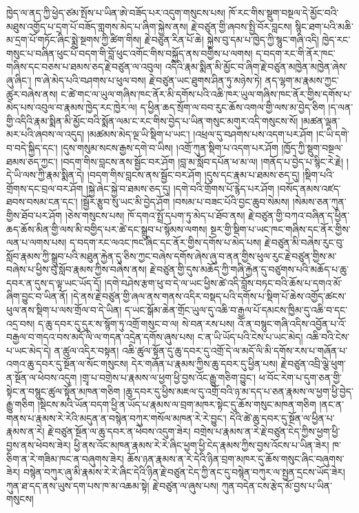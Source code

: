 \documentclass{article}
\begin{document}
ཁྱེད་ལ་ནད་ཀྱི་ཕྱེད་ཙམ་སྤོས་པ་ཡིན་ཨེ་བཟོད་པར་འདུག་གསུངས་པས། ཁོ་རང་གིས་སྡུག་བསྔལ་དེ་མྱོང་བའི་མཐུས་འགྱོད་པ་དྲག་པོ་བཟོད་གླགས་མེད་པ་ཞིག་སྐྱེས་ནས། རྗེ་བཙུན་གྱི་ཞབས་སྤྱི་བོར་བླངས། སྙིང་ཐག་པའི་མཆི་མ་དྲག་པོ་གཏོང་ཞིང་སྨྲེ་སྔགས་ཀྱི་ཚིག་གིས། རྗེ་བཙུན་རིན་པོ་ཆེ། སྐྱེས་བུ་དམ་པ་ཁྱེད་ཀྱི་སྙུང་གཞི་འདི། ཁྱེད་རང་གསུང་པ་བཞིན་ཕུང་པོ་བདག་གི་བློ་ཕུང་འགོང་གིས་བསྐྱོད་ནས་བགྱིས་པ་ལགས། ད་བདག་རང་གི་ནོར་ཁང་གཞིས་དང་བཅས་པ་ཐམས་ཅད་རྗེ་བཙུན་ལ་འབུལ། འདིའི་རྣམ་སྨིན་མི་མྱོང་བ་ཞིག་རྗེ་བཙུན་མཁྱེན་མཁྱེན་ཞེས་ཞུ་ཞིང་། ཁ་ཞེ་མེད་པའི་བཤགས་པ་ཕུལ་བས། རྗེ་བཙུན་ཡང་ཐུགས་ཤིན་ཏུ་མཉེས་ཏེ། ནད་ལྷག་མ་རྣམས་ཀྱང་ཚུར་བཞེས་ནས། ང་ཚེ་གང་ལ་ཡུལ་གཞིས་ཁང་ནོར་མི་དགོས་པའི་འཆི་ཁར་ཡུལ་གཞིས་ཁང་ནོར་གྱིས་དགོས་པ་མེད་པས་འབུལ་བ་རྣམས་ཁྱེད་རང་ཁྱེར་ལ། ད་ཕྱིན་ཆད་སྲོག་ལ་བབ་རུང་ཆོས་འགལ་གྱི་ལས་མ་བྱེད་ཅིག །ད་ལན་གྱི་འདིའི་རྣམ་སྨིན་མི་མྱོང་བའི་སྨོན་ལམ་ང་རང་གིས་བྱེད་པ་ཡིན་གསུང་མགུར་འདི་གསུངས་སོ། །མཚན་ལྡན་མར་པའི་ཞབས་ལ་འདུད། །མཚམས་མེད་ལྔ་ཡི་སྡིག་པ་ཡང་། །འཕྲལ་དུ་བཤགས་པས་འདག་པར་ཤོག །ང་ཡི་དགེ་བ་བདེ་སྐྱིད་དང་། །དུས་གསུམ་སངས་རྒྱས་དགེ་བ་ཡིས། །འགྲོ་ཀུན་སྡིག་པ་འདག་པར་ཤོག །ཁྱོད་ཀྱི་སྡུག་བསྔལ་ཐམས་ཅད་ཀྱང་། །བདག་གིས་བླངས་ནས་སྦྱོང་བར་ཤོག །བླ་མ་སློབ་དཔོན་ཕ་མ་ལ། །གནོད་པ་བྱེད་པ་སྙིང་རེ་རྗེ། །དེ་ཡི་ལས་ཀྱི་རྣམ་སྨིན་དེ། །བདག་གིས་བླངས་ནས་སྦྱོང་བར་ཤོག །དུས་དང་རྣམ་པ་ཐམས་ཅད་དུ། །སྡིག་པའི་གྲོགས་དང་བྲལ་བར་ཤོག །སྐྱེ་ཞེང་སྐྱེ་བ་ཐམས་ཅད་དུ། །དགེ་བའི་གྲོགས་པོ་རྙེད་པར་ཤོག །བསོད་ནམས་འཛད་ཐབས་བསམ་ངན་དང་། །སྦྱོར་རྩུབ་སུ་ཡང་མི་བྱེད་ཤོག །བསམ་པ་བཟང་པོའི་བྱང་ཆུབ་སེམས། །སེམས་ཅན་ཀུན་གྱིས་ཐོབ་པར་ཤོག །ཅེས་གསུངས་པས། ཁོ་དགའ་སྤྲོ་དཔག་ཏུ་མེད་པ་ཐོབ་ནས། རྗེ་བཙུན་གྱི་བཀའ་བཞིན་ད་ཕྱིན་ཆད་ཆོས་མིན་གྱི་ལས་མི་བགྱིད་པར་ཚེ་དང་སྒྲུབ་པ་སྙོམས་ལགས། སྔར་གྱི་སྡིག་པ་ཡང་ཁང་གཞིས་དང་ནོར་གྱིས་ལན་པ་ལགས་པས། ད་བདག་རང་ལའང་ཁང་ཞིང་དང་ནོར་གྱིས་དགོས་པ་མེད་པས། རྗེ་བཙུན་མི་བཞེས་རུང་བུ་སློབ་རྣམས་ཀྱི་སྒྲུབ་པའི་མཐུན་རྐྱེན་དུ་ཅིས་ཀྱང་བཞེས་དགོས་ཞེས་ཞུ་བ་ནན་གྱིས་ཕུལ་རུང་རྗེ་བཙུན་གྱིས་མ་བཞེས་པ་ཕྱིས་བུ་སློབ་རྣམས་ཀྱིས་བཞེས་ནས། རྗེ་བཙུན་གྱི་དུས་མཆོད་ཀྱི་གཞི་རྐྱེན་དུ་བཙུགས་པའི་མཆོད་པ་ཆུ་དབར་ན་དུས་ད་ལྟ་ཡང་ཡོད་དོ། །དགེ་བཤེས་རྩག་ཕུ་བ་དེ་ལ་ཡང་ཕྱིས་ཚེ་འདི་བློས་བཏང་བའི་ཆོས་པ་དགའ་མོ་ཞིག་བྱུང་བ་ཡིན་ནོ། །དེ་ནས་རྗེ་བཙུན་གྱི་ཞལ་ནས་གནས་འདིར་བསྡད་པའི་དགོས་པ་སྡིག་པོ་ཆེས་འགྱོད་ཚངས་ཕུལ་ནས་སྡིག་པ་ལས་གྲོལ་བ་དེ་ཡིན། ད་ཡང་སྒོམ་ཆེན་གྲོང་ཡུལ་དུ་འཆི་བ་རྒྱལ་པོ་དམངས་ཁྱིམ་དུ་འཆི་བ་དང་འདྲ་བས། ད་ཆུ་དབར་དུ་དུར་ས་སྙོག་ཏུ་འགྲོ་གསུང་བ་ལ། སེ་བན་རས་པས། འོ་ན་བསྙུང་གཞི་འདིས་འབྱོན་པ་འོ་བརྒྱལ་བ་གདའ་བས་མདོ་ལི་ལ་གདན་འདྲེན་དགོས་ཞུས་པས། ང་ན་ཡི་ཡོད་པའི་ངེས་པ་ཡང་མེད། འཆི་བའི་ངེས་པ་ཡང་མེད་དེ། ན་ཚུལ་འདིར་བསྟན། འཆི་ཚུལ་སྟོན་དུ་ཆུ་དབར་དུ་འགྲོ་དེ་ལ་མདོ་ལི་མི་དགོས་རས་པ་གཞོན་པ་འགའ་ཆུ་དབར་དུ་སྔོན་ལ་སོང་གསུངས། དེར་གཞོན་པ་རྣམས་ཀྱིས་ཆུ་དབར་དུ་ཕྱིན་པས། རྗེ་བཙུན་འབྲི་ལྕེ་ཕུག་ན་སྔོན་ལ་ཕེབས་འདུག །གྲྭ་པ་བགྲེས་པ་རྣམས་ལ་ཕྱག་ཕྱི་བྱས་འོང་རྒྱུ་གཅིག་བྱུང་། ཕ་བོང་རེག་པ་དུག་ཅན་གྱི་སྟེང་ན་བསྙུང་ཚུལ་སྟོན་མཁན་གཅིག །ཆུ་དབར་དུ་ཕྱིས་མཇལ་དུ་འགྲོ་བའི་ཉ་མ་དད་པ་ཅན་རྣམས་ལ་ཕྱག་ཕྱི་བྱེད་རྒྱུ་གཅིག །སྡིངས་མའི་ཡོན་བདག་ཕྱི་ན་ཡོད་པ་རྣམས་ལ་བྲག་མཁར་སྟེང་དུ་ཆོས་གསུང་མཁན་གཅིག །ནང་ན་གནས་པ་རྣམས་རེ་རེའི་མདུན་ན་བསྙེན་བཀུར་གསོལ་མཁན་རེ་རེ་བྱུང་། དེའི་ཚེ་ཆུ་དབར་དུ་སྔོན་ལ་ཕྱིན་པ་རྣམས་ན་རེ། རྗེ་བཙུན་སྔོན་ལ་ཆུ་དབར་ན་ཕེབས་འདུག་ཟེར། བགྲེས་པ་རྣམས་ན་རེ་རྗེ་བཙུན་ངེད་ཀྱིས་ཕྱག་ཕྱི་བྱས་ནས་ཕེབས་ཟེར། ཕྱི་ནས་འོང་མཁན་རྣམས་རེ་རེ་ཞིང་ཕྱག་ཕྱི་ངེད་རྣམས་ཀྱིས་བྱས་འོངས་པ་ཡིན་ཟེར། ཁ་ཅིག་ན་རེ་གཟིམ་ཁང་ན་བཞུགས་ཟེར། ཆོས་ཉན་རྣམས་ན་རེ་དེའི་ཉིན་བྲག་མཁར་དུ་ཆོས་གསུང་ཞིང་བཞུགས་ཟེར། བསྙེན་བཀུར་ཞུ་མི་རྣམས་རེ་རེ་ཞིང་དེའི་ཉིན་རྗེ་བཙུན་ངེད་ཀྱི་ནང་དུ་བསྙེན་བཀུར་ལ་སྤྱན་དྲངས་ཡོད་ཟེར། ཀུན་ཐ་དད་ནས་ཡུས་དག་པས་ཁ་མ་འཆམ་སྟེ། རྗེ་བཙུན་ལ་ཞུས་པས། ཀུན་བདེན་ངས་རྩེད་མོ་བྱས་པ་ཡིན་གསུངས། 
\end{document}
